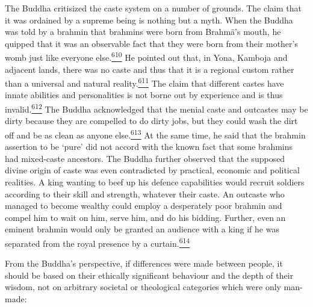 The Buddha critisized the caste system on a number of grounds. The claim
that it was ordained by a supreme being is nothing but a myth. When the
Buddha was told by a brahmin that brahmins were born from Brahmā's
mouth, he quipped that it was an observable fact that they were born
from their mother's womb just like everyone
else.\label{footprints_split_015.html_fnref610}\hyperref[footprints_split_025.htmlux5cux23fn610]{\textsuperscript{610}}
He pointed out that, in Yona, Kamboja and adjacent lands, there was no
caste and thus that it is a regional custom rather than a universal and
natural
reality.\label{footprints_split_015.html_fnref611}\hyperref[footprints_split_025.htmlux5cux23fn611]{\textsuperscript{611}}
The claim that different castes have innate abilities and personalities
is not borne out by experience and is thus
invalid.\label{footprints_split_015.html_fnref612}\hyperref[footprints_split_025.htmlux5cux23fn612]{\textsuperscript{612}}
The Buddha acknowledged that the menial caste and outcastes may be dirty
because they are compelled to do dirty jobs, but they could wash the
dirt off and be as clean as anyone
else.\label{footprints_split_015.html_fnref613}\hyperref[footprints_split_025.htmlux5cux23fn613]{\textsuperscript{613}}
At the same time, he said that the brahmin assertion to be `pure' did
not accord with the known fact that some brahmins had mixed-caste
ancestors. The Buddha further observed that the supposed divine origin
of caste was even contradicted by practical, economic and political
realities. A king wanting to beef up his defence capabilities would
recruit soldiers according to their skill and strength, whatever their
caste. An outcaste who managed to become wealthy could employ a
desperately poor brahmin and compel him to wait on him, serve him, and
do his bidding. Further, even an eminent brahmin would only be granted
an audience with a king if he was separated from the royal presence by a
curtain.\label{footprints_split_015.html_fnref614}\hyperref[footprints_split_025.htmlux5cux23fn614]{\textsuperscript{614}}

From the Buddha's perspective, if differences were made between people,
it should be based on their ethically significant behaviour and the
depth of their wisdom, not on arbitrary societal or theological
categories which were only man-made:

